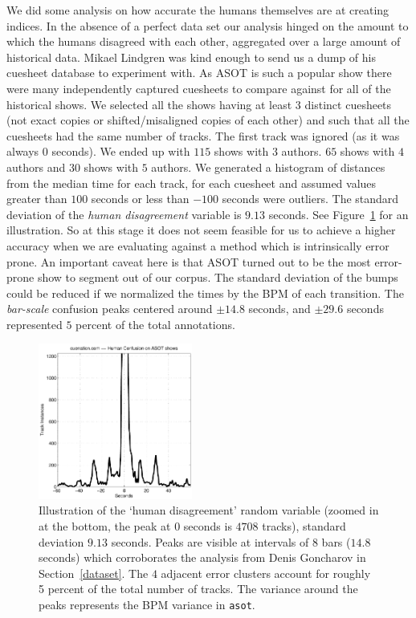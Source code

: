 \documentclass[twocolumn]{article}
\begin{document}
	We did some analysis on how accurate the humans themselves are at creating indices. In the absence of a perfect data set our analysis hinged on the amount to which the humans disagreed with each other, aggregated over a large amount of historical data. Mikael Lindgren was kind enough to send us a dump of his cuesheet database to experiment with. As ASOT is such a popular show there were many independently captured cuesheets to compare against for all of the historical shows. We selected all the shows having at least $3$ distinct cuesheets (not exact copies or shifted/misaligned copies of each other)  and such that all the cuesheets had the same number of tracks. The first track was ignored (as it was always $0$ seconds). We ended up with $115$ shows with $3$ authors. $65$ shows with $4$ authors and $30$ shows with $5$ authors.  We generated a histogram of distances from the median time for each track, for each cuesheet and assumed values greater than $100$ seconds or less than $-100$ seconds were outliers. The standard deviation of the \textit{human disagreement} variable is $9.13$ seconds. See Figure~\ref{fig:human_muchconfuse} for an illustration. So at this stage it does not seem feasible for us to achieve a higher accuracy when we are evaluating against a method which is intrinsically error prone. An important caveat here is that ASOT turned out to be the most error-prone show to segment out of our corpus. The standard deviation of the bumps could be reduced if we normalized the times by the BPM of each transition. The \textit{bar-scale} confusion peaks centered around $\pm14.8$ seconds, and $\pm29.6$ seconds represented $5$ percent of the total annotations.
	
	\begin{figure}
		\centering
		\includegraphics[width=0.45\textwidth]{images/human_confusion}
		
		\caption{Illustration of the `human disagreement' random variable (zoomed in at the bottom, the peak at $0$ seconds is $4708$ tracks), standard deviation $9.13$ seconds. Peaks are visible at intervals of $8$ bars ($14.8$ seconds) which corroborates the analysis from Denis Goncharov in Section~\ref{dataset}. The $4$ adjacent error clusters account for roughly 5 percent of the total number of tracks. The variance around the peaks represents the BPM variance in \texttt{asot}. }
		\label{fig:human_muchconfuse}
	\end{figure} 
	
\end{document}
